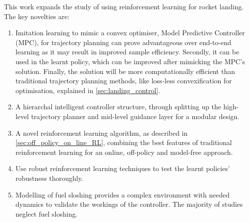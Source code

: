 This work expands the study of using reinforcement learning for rocket landing. The key novelties are:
\begin{enumerate}
    \item Imitation learning to mimic a convex optimiser, Model Predictive Controller (MPC), for trajectory planning can prove advantageous over end-to-end learning as it may result in improved sample efficiency. Secondly, it can be used in the learnt policy, which can be improved after mimicking the MPC's solution. Finally, the solution will be more computationally efficient than traditional trajectory planning methods, like loss-less convexification for optimisation, explained in \autoref{sec:landing_control}.
    \item A hierarchal intelligent controller structure, through splitting up the high-level trajectory planner and mid-level guidance layer for a modular design.
    \item A novel reinforcement learning algorithm, as described in \autoref{sec:off_policy_on_line_RL}, combining the best features of traditional reinforcement learning for an online, off-policy and model-free approach.
    \item Use robust reinforcement learning techniques to test the learnt policies' robustness thoroughly.
    \item Modelling of fuel sloshing provides a complex environment with needed dynamics to validate the workings of the controller. The majority of studies neglect fuel sloshing.
\end{enumerate}